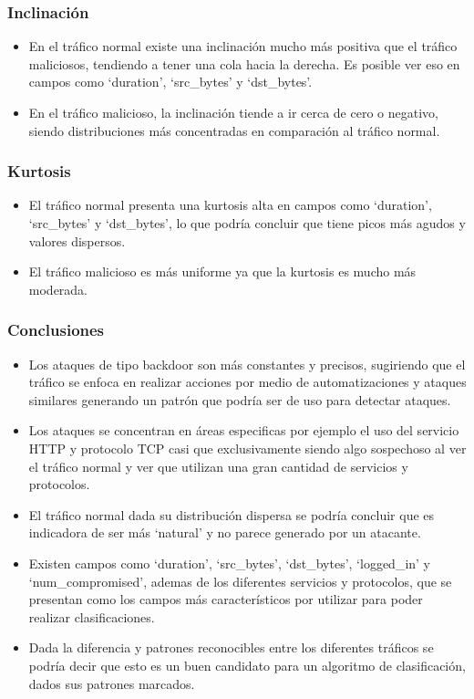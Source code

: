\documentclass[12pt,a4paper]{article}
\begin{document}
\subsubsection{Inclinación}

\begin{itemize}
  \item En el tráfico normal existe una inclinación mucho más positiva que el tráfico maliciosos, tendiendo a tener una cola hacia la derecha.
    Es posible ver eso en campos como `duration', `src_bytes' y `dst_bytes'.
  \item En el tráfico malicioso, la inclinación tiende a ir cerca de cero o negativo, siendo distribuciones más concentradas en comparación al tráfico normal.
\end{itemize}

\subsubsection{Kurtosis}

\begin{itemize}
  \item El tráfico normal presenta una kurtosis alta en campos como `duration', `src_bytes' y `dst_bytes', lo que podría concluir que tiene picos más agudos y valores dispersos.
  \item El tráfico malicioso es más uniforme ya que la kurtosis es mucho más moderada.
\end{itemize}

\subsubsection{Conclusiones}

\begin{itemize}
  \item Los ataques de tipo backdoor son más constantes y precisos, sugiriendo que el tráfico se enfoca en realizar acciones por medio de automatizaciones y ataques similares generando un patrón que podría ser de uso para detectar ataques.
  \item Los ataques se concentran en áreas especificas por ejemplo el uso del servicio HTTP y protocolo TCP casi que exclusivamente siendo algo sospechoso al ver el tráfico normal y ver que utilizan una gran cantidad de servicios y protocolos.
  \item El tráfico normal dada su distribución dispersa se podría concluir que es indicadora de ser más `natural' y no parece generado por un atacante.
  \item Existen campos como `duration', `src_bytes', `dst_bytes', `logged_in' y `num_compromised', ademas de los diferentes servicios y protocolos, que se presentan como los campos más característicos por utilizar para poder realizar clasificaciones.
  \item Dada la diferencia y patrones reconocibles entre los diferentes tráficos se podría decir que esto es un buen candidato para un algoritmo de clasificación, dados sus patrones marcados.
\end{itemize}
\end{document}
